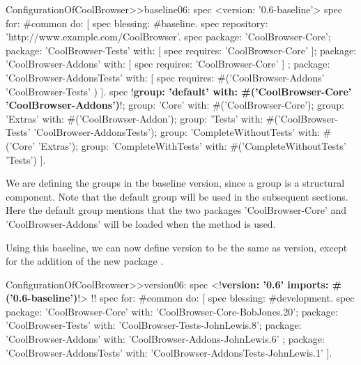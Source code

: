 \documentclass[a4paper,10pt,twoside]{book}
\begin{document}
 
\begin{code}{}
ConfigurationOfCoolBrowser>>baseline06: spec 
     <version: '0.6-baseline'>
     spec for: #common do: [
          spec blessing: #baseline.
          spec repository: 'http://www.example.com/CoolBrowser'.
          spec 
                 package: 'CoolBrowser-Core';
                 package: 'CoolBrowser-Tests' with: [ spec requires: 'CoolBrowser-Core' ];
                 package: 'CoolBrowser-Addons' with: [ spec requires: 'CoolBrowser-Core' ] ;
                 package: 'CoolBrowser-AddonsTests' with: [ 
                      spec requires: #('CoolBrowser-Addons' 'CoolBrowser-Tests' ) ].
          spec 
                 !\textbf{group: 'default' with: \#('CoolBrowser-Core' 'CoolBrowser-Addons')}!;
                 group: 'Core' with: #('CoolBrowser-Core');
                 group: 'Extras' with: #('CoolBrowser-Addon');
                 group: 'Tests' with: #('CoolBrowser-Tests' 'CoolBrowser-AddonsTests');
                 group: 'CompleteWithoutTests' with: #('Core' 'Extras');
                 group: 'CompleteWithTests' with: #('CompleteWithoutTests' 'Tests')
               ].
\end{code}


 
We are defining the groups in the baseline version, since a group is a structural component. Note that the default group will be used in the subsequent sections. Here the default group mentions that the two packages 'CoolBrowser-Core' and 'CoolBrowser-Addons' will be loaded when the method  is used.

Using this baseline, we can now define version  to be the same as version, except for the addition of the new package .
 
\begin{code}{}
ConfigurationOfCoolBrowser>>version06: spec 
       <!\textbf{version: '0.6' imports: \#('0.6-baseline')}!>
!\vspace{-0.7ex}!
      spec for: #common do: [
            spec blessing: #development.
            spec 
                  package: 'CoolBrowser-Core' with: 'CoolBrowser-Core-BobJones.20';
                  package: 'CoolBrowser-Tests' with: 'CoolBrowser-Tests-JohnLewis.8';
                  package: 'CoolBrowser-Addons' with: 'CoolBrowser-Addons-JohnLewis.6' ;
                  package: 'CoolBrowser-AddonsTests' with: 'CoolBrowser-AddonsTests-JohnLewis.1' ].
\end{code}
\end{document}
